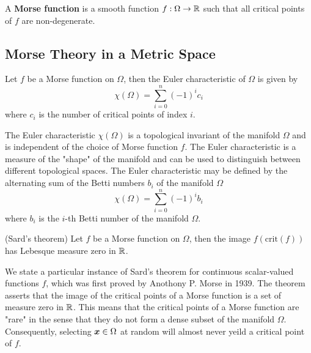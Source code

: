 \documentclass[10pt]{article}
\begin{document}
    \begin{definition}
        A \textbf{Morse function} is a smooth function $f : \Omega \rightarrow \mathbb{R}$ such that
        all critical points of $f$ are non-degenerate.
    \end{definition}

    \subsection{Morse Theory in a Metric Space}

    \begin{theorem}
            Let $f$ be a Morse function on $\Omega$, then the Euler characteristic of $\Omega$ is
            given by
            $$
                \chi(\Omega) = \sum_{i=0}^n (-1)^i c_i
            $$
            where $c_i$ is the number of critical points of index $i$.
    \end{theorem}

    \begin{remark}
        The Euler characteristic $\chi(\Omega)$ is a topological invariant of the manifold $\Omega$
        and is independent of the choice of Morse function $f$.
        The Euler characteristic is a measure of the "shape" of the manifold and can be used to
        distinguish between different topological spaces.
        The Euler characteristic may be defined by the alternating sum of the Betti numbers
        $b_i$ of the manifold $\Omega$
        $$
            \chi(\Omega) = \sum_{i=0}^n (-1)^i b_i
        $$
        where $b_i$ is the $i$-th Betti number of the manifold $\Omega$.
    \end{remark}

    \begin{theorem}
        (Sard's theorem) Let $f$ be a Morse function on $\Omega$, then
        the image $f(\text{crit}(f))$ has Lebesque measure zero in $\mathbb{R}$.
    \end{theorem}

    \begin{remark}
        We state a particular instance of Sard's theorem for continuous scalar-valued functions $f$,
        which was first proved by Anothony P. Morse in 1939.
        The theorem asserts that the image of the critical points of a Morse function is a set 
        of measure zero in $\mathbb{R}$. This means that the critical points of a Morse function are "rare" in the sense that they
        do not form a dense subset of the manifold $\Omega$.
        Consequently, selecting $\bm{x} \in \Omega$ at random will almost never yeild a critical
        point of $f$.
    \end{remark}
\end{document}
